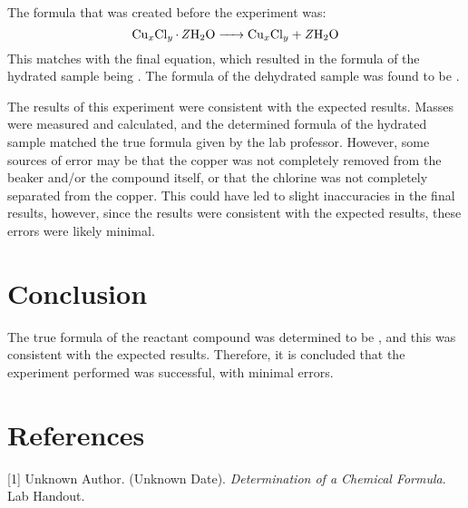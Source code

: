 \documentclass[12pt]{article}
\begin{document}
The formula that was created before the experiment was:
\begin{equation*}
    \ce{Cu_xCl_y * \text{\textit{Z}}H2O -> Cu_xCl_y + \text{\textit{Z}}H2O}
\end{equation*}
This matches with the final equation, which resulted in the formula of the hydrated sample being
. The formula of the dehydrated sample was found to be .

The results of this experiment were consistent with the expected results. Masses were measured and
calculated, and the determined formula of the hydrated sample matched the true formula given by the
lab professor. However, some sources of error may be that the copper was not completely removed from
the beaker and/or the compound itself, or that the chlorine was not completely separated from the
copper. This could have led to slight inaccuracies in the final results, however, since the results
were consistent with the expected results, these errors were likely minimal.

\section*{Conclusion}

The true formula of the reactant compound was determined to be , and this was consistent
with the expected results. Therefore, it is concluded that the experiment performed was successful, with
minimal errors.

\section*{References}

[1] Unknown Author. (Unknown Date). \textit{Determination of a Chemical Formula}. Lab Handout.
\end{document}
